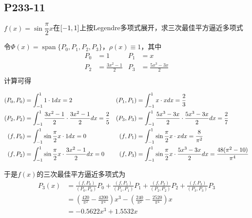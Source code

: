 \subsection{P233-11}
\renewcommand{\FX}{\sin \dfrac{\pi}{2} x}
\renewcommand{\LRANGE}{-1}
\renewcommand{\RRANGE}{1}
\newcommand{\PA}{P_0}
\newcommand{\PB}{P_1}
\newcommand{\PC}{P_2}
\newcommand{\PD}{P_3}
\renewcommand{\PART}[1]{\frac{(f, P_{#1})}{(P_{#1}, P_{#1})} P_{#1}}
\renewcommand{\COEFFICIENTS}[8]{
\begin{align*}
\FUNCDOT{P_0}{P_0} & = \INTRANGE{\PA \cdot \PA}{x} = #1 &
\FUNCDOT{P_1}{P_1} & = \INTRANGE{\PB \cdot \PB}{x} = #2 \\
\FUNCDOT{P_2}{P_2} & = \INTRANGE{\PC \cdot \PC}{x} = #3 &
\FUNCDOT{P_3}{P_3} & = \INTRANGE{\PD \cdot \PD}{x} = #4 \\
\FUNCDOT{f}{P_0}   & = \INTRANGE{\FX \cdot \PA}{x} = #5 &
\FUNCDOT{f}{P_1}   & = \INTRANGE{\FX \cdot \PB}{x} = #6 \\
\FUNCDOT{f}{P_2}   & = \INTRANGE{\FX \cdot \PC}{x} = #7 &
\FUNCDOT{f}{P_3}   & = \INTRANGE{\FX \cdot \PD}{x} = #8 \\
\end{align*}
}

$f(x) = \FX$在$\RANGE$上按Legendre多项式展开，求三次最佳平方逼近多项式
\begin{SOLVE}
\renewcommand{\PA}{1}
\renewcommand{\PB}{x}
\renewcommand{\PC}{\frac{3 x^2 - 1}{2}}
\renewcommand{\PD}{\frac{5 x^3 - 3 x}{2}}
令$\Phi(x)=\operatorname{span}\{P_0, P_1, P_2, P_3\}$，$\rho(x) \equiv 1$，其中
\begin{align*}
P_0 & = \PA &
P_1 & = \PB \\
P_2 & = \PC &
P_3 & = \PD \\
\end{align*}
计算可得
\COEFFICIENTS{2}{\frac{2}{3}}{\frac{2}{5}}{\frac{2}{7}}{0}{\frac{8}{\pi^2}}{0}{\frac{48(\pi^2 - 10)}{\pi^4}}
于是$f(x)$的三次最佳平方逼近多项式为\begin{align*}
P_3(x) & = \PART{0} + \PART{1} + \PART{2} + \PART{3} \\
       & = (\frac{420}{\pi^2} - \frac{4200}{\pi^4}) x^3 - (\frac{240}{\pi^2} - \frac{2520}{\pi^4}) x \\
       & = -0.5622 x^3 + 1.5532 x
\end{align*}
\end{SOLVE}